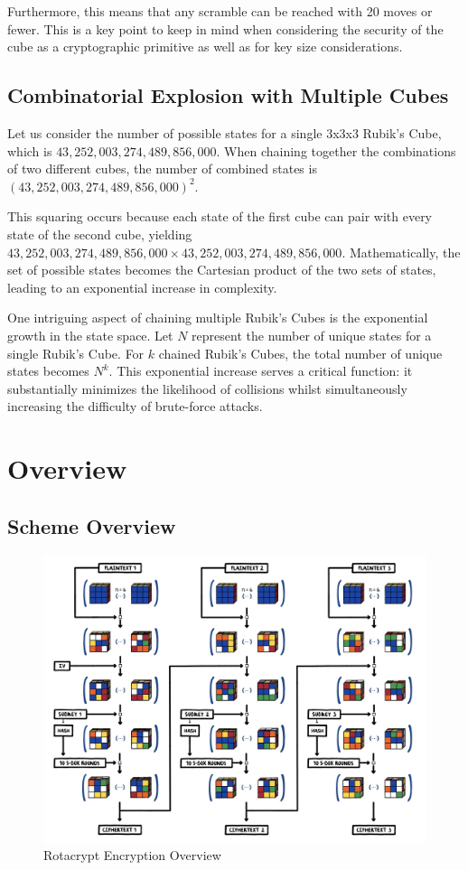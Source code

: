 \documentclass[12pt]{article}
\begin{document}
Furthermore, this means that any scramble can be reached with 20 moves or fewer. This is a key point to keep in mind when considering the security of the cube as a cryptographic primitive as well as for key size considerations.\\

\subsection{Combinatorial Explosion with Multiple Cubes}
Let us consider the number of possible states for a single 3x3x3 Rubik's Cube, which is \(43,252,003,274,489,856,000\). When chaining together the combinations of two different cubes, the number of combined states is \((43,252,003,274,489,856,000)^2\).

This squaring occurs because each state of the first cube can pair with every state of the second cube, yielding \(43,252,003,274,489,856,000 \times 43,252,003,274,489,856,000\). Mathematically, the set of possible states becomes the Cartesian product of the two sets of states, leading to an exponential increase in complexity.

One intriguing aspect of chaining multiple Rubik's Cubes is the exponential growth in the state space. Let \( N \) represent the number of unique states for a single Rubik's Cube. For \( k \) chained Rubik's Cubes, the total number of unique states becomes \( N^k \). This exponential increase serves a critical function: it substantially minimizes the likelihood of collisions whilst simultaneously increasing the difficulty of brute-force attacks.

\section{Overview}

\subsection{Scheme Overview}

\begin{figure}[H]
    \centering
    \includegraphics[width=\textwidth]{encryption/encryption.jpg}
    \caption{Rotacrypt Encryption Overview}
\end{figure}
\end{document}
